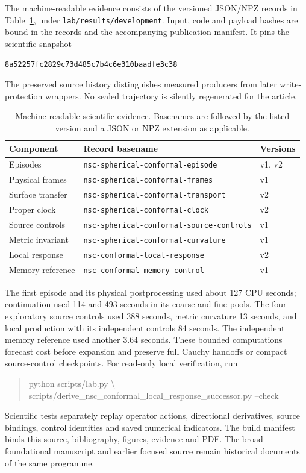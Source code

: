 \documentclass[11pt]{article}
\providecommand{\ScienceSnapshot}{\texttt{8a52257fc2829c73d485c7b4c6e310baadfe3c38}}
\begin{document}
The machine-readable evidence consists of the versioned JSON/NPZ records
in Table~\ref{tab:evidence}, under \texttt{lab/results/development}.
Input, code and payload hashes are bound in the records and the accompanying
publication manifest. It pins the scientific snapshot
\begin{center}\ScienceSnapshot\end{center}
The preserved source history distinguishes measured
producers from later write-protection wrappers. No sealed trajectory is
silently regenerated for the article.

\begin{table}[tbp]
\centering
\caption{Machine-readable scientific evidence. Basenames are followed by
the listed version and a JSON or NPZ extension as applicable.}
\label{tab:evidence}
\begin{tabular}{lll}
\toprule
Component & Record basename & Versions\\
\midrule
Episodes & \texttt{nsc-spherical-conformal-episode} & v1, v2\\
Physical frames & \texttt{nsc-spherical-conformal-frames} & v1\\
Surface transfer & \texttt{nsc-spherical-conformal-transport} & v2\\
Proper clock & \texttt{nsc-spherical-conformal-clock} & v2\\
Source controls & \texttt{nsc-spherical-conformal-source-controls} & v1\\
Metric invariant & \texttt{nsc-spherical-conformal-curvature} & v1\\
Local response & \texttt{nsc-conformal-local-response} & v2\\
Memory reference & \texttt{nsc-conformal-memory-control} & v1\\
\bottomrule
\end{tabular}
\end{table}

The first episode and its physical postprocessing used about 127 CPU
seconds; continuation used 114 and 493 seconds in its coarse and fine pools.
The four exploratory source controls used 388 seconds, metric curvature
13 seconds, and local production with its independent controls 84 seconds.
The independent memory reference used another 3.64 seconds.
These bounded computations forecast cost before expansion and preserve
full Cauchy handoffs or compact source-control checkpoints.
For read-only local verification, run
\begin{quote}\small\ttfamily
python scripts/lab.py \textbackslash\\
scripts/derive\_nsc\_conformal\_local\_response\_successor.py --check
\end{quote}
Scientific tests separately replay operator actions, directional derivatives,
source bindings, control identities and saved numerical indicators.
The build manifest binds this source, bibliography, figures, evidence and
PDF. The broad foundational manuscript and earlier focused source remain
historical documents of the same programme.
\end{document}
